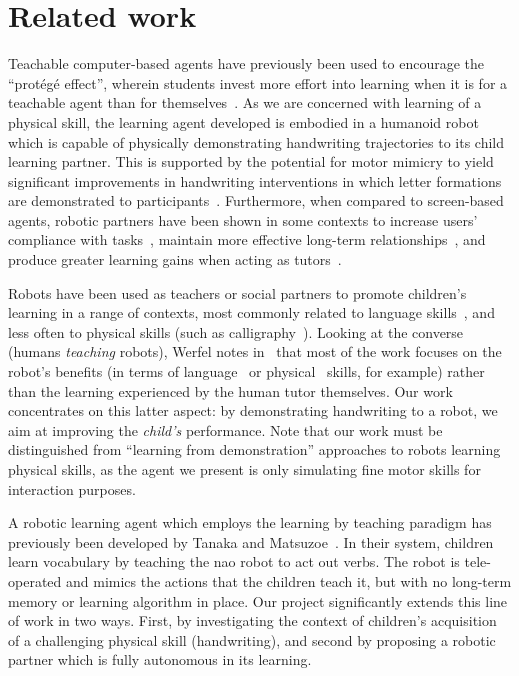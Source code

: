 \documentclass{sig-alternate}
\begin{document}
\section{Related work}

Teachable computer-based agents have previously been used to encourage the
``protégé effect'', wherein students invest more effort into learning when it is
for a teachable agent than for themselves~\cite{Chase2009}.  As we are concerned
with learning of a physical skill, the learning agent developed is embodied in a
humanoid robot which is capable of physically demonstrating handwriting
trajectories to its child learning partner.  This is supported by the potential
for motor mimicry to yield significant improvements in handwriting interventions
in which letter formations are demonstrated to
participants~\cite{Berninger1997}. Furthermore, when compared to screen-based
agents, robotic partners have been shown in some contexts to increase users'
compliance with tasks~\cite{Bainbridge2011}, maintain more effective long-term
relationships~\cite{Kidd2008}, and produce greater learning gains when acting as
tutors~\cite{Leyzberg2012}.

Robots have been used as teachers or social partners to promote children's
learning in a range of contexts, most commonly related to language
skills~\cite{Han2010}, and less often to physical skills (such as
calligraphy~\cite{Matsui2013}).  Looking at the converse (humans \emph{teaching}
robots), Werfel notes in~\cite{Werfel2014} that most of the work focuses on the
robot's benefits (in terms of language~\cite{Saunders2010} or
physical~\cite{Mulling2013} skills, for example) rather than the learning
experienced by the human tutor themselves.  Our work concentrates on this latter
aspect: by demonstrating handwriting to a robot, we aim at improving the
\emph{child's} performance. Note that our work must be distinguished from
``learning from demonstration'' approaches to robots learning physical skills, 
as the agent we present is only simulating fine motor skills for interaction 
purposes.

A robotic learning agent which employs the learning by teaching paradigm has
previously been developed by Tanaka and Matsuzoe~\cite{Tanaka2012}. In their
system, children learn vocabulary by teaching the {\sc nao} robot to act out
verbs. The robot is tele-operated and mimics the actions that the children teach
it, but with no long-term memory or learning algorithm in place.  Our project
significantly extends this line of work in two ways. First, by investigating the
context of children's acquisition of a challenging physical skill (handwriting),
and second by proposing a robotic partner which is fully autonomous in its
learning.
\end{document}
